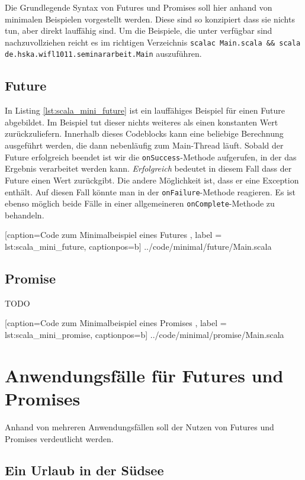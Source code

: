 \documentclass[11pt,a4paper,titlepage,ngerman]{scrartcl}
\begin{document}
Die Grundlegende Syntax von Futures und Promises soll hier anhand von minimalen
Beispielen vorgestellt werden. Diese sind so konzipiert dass sie nichts
tun, aber direkt lauffähig sind. Um die Beispiele, die unter \cite{code}
verfügbar sind nachzuvollziehen reicht es im richtigen Verzeichnis 
\texttt{scalac Main.scala \&\& scala de.hska.wifl1011.seminararbeit.Main} auszuführen.

\subsection{Future}

In Listing \ref{lst:scala_mini_future} ist ein lauffähiges Beispiel für einen 
Future abgebildet. Im Beispiel tut dieser nichts weiteres als einen konstanten
Wert zurückzuliefern. Innerhalb dieses Codeblocks kann eine beliebige Berechnung
ausgeführt werden, die dann nebenläufig zum Main-Thread läuft. Sobald der Future
erfolgreich beendet ist wir die \texttt{onSuccess}-Methode aufgerufen, in der
das Ergebnis verarbeitet werden kann. \emph{Erfolgreich} bedeutet in diesem
Fall dass der Future einen Wert zurückgibt. Die andere Möglichkeit ist, dass
er eine Exception enthält. Auf diesen Fall könnte man in der \texttt{onFailure}-Methode
reagieren. Es ist ebenso möglich beide Fälle in einer allgemeineren
\texttt{onComplete}-Methode zu behandeln.


    [caption={Code zum Minimalbeispiel eines Futures },
       label = lst:scala_mini_future,
       captionpos=b]
 {../code/minimal/future/Main.scala}

\subsection{Promise}

TODO


    [caption={Code zum Minimalbeispiel eines Promises },
       label = lst:scala_mini_promise,
       captionpos=b]
 {../code/minimal/promise/Main.scala}

\section{Anwendungsfälle für Futures und Promises}

Anhand von mehreren Anwendungsfällen soll der Nutzen von Futures und Promises
verdeutlicht werden. 

\subsection{Ein Urlaub in der Südsee}
\end{document}
